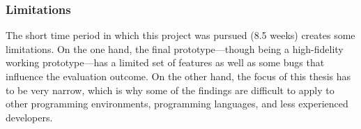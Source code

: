 \subsubsection{Limitations}\label{limitations}

The short time period in which this project was pursued (8.5 weeks)
creates some limitations. On the one hand, the final prototype—though
being a high-fidelity working prototype—has a limited set of features as
well as some bugs that influence the evaluation outcome. On the other
hand, the focus of this thesis has to be very narrow, which is why some
of the findings are difficult to apply to other programming
environments, programming languages, and less experienced developers.
